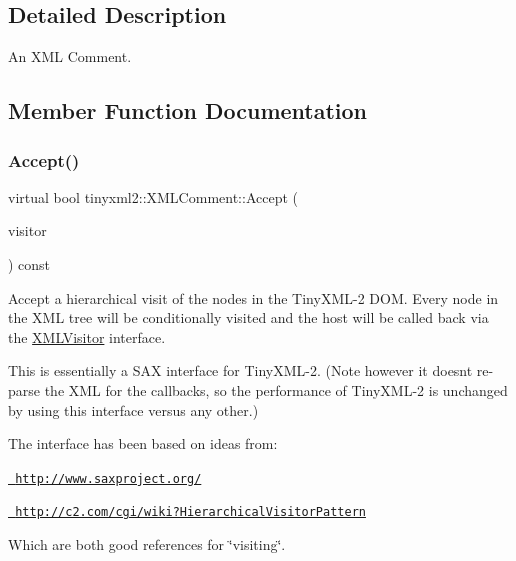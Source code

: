 \subsection{Detailed Description}
An X\+ML Comment. 

\subsection{Member Function Documentation}
\mbox{\label{classtinyxml2_1_1XMLComment_a4a33dc32fae0285b03f9cfcb3e43e122}} 
\subsubsection{\texorpdfstring{Accept()}{Accept()}}
{\footnotesize\ttfamily virtual bool tinyxml2\+::\+X\+M\+L\+Comment\+::\+Accept (\begin{DoxyParamCaption}\item[{\mbox{\hyperlink{classtinyxml2_1_1XMLVisitor}{X\+M\+L\+Visitor}} $\ast$}]{visitor }\end{DoxyParamCaption}) const\hspace{0.3cm}{\ttfamily [virtual]}}

Accept a hierarchical visit of the nodes in the Tiny\+X\+M\+L-\/2 D\+OM. Every node in the X\+ML tree will be conditionally visited and the host will be called back via the \mbox{\hyperlink{classtinyxml2_1_1XMLVisitor}{X\+M\+L\+Visitor}} interface.

This is essentially a S\+AX interface for Tiny\+X\+M\+L-\/2. (Note however it doesn\textquotesingle{}t re-\/parse the X\+ML for the callbacks, so the performance of Tiny\+X\+M\+L-\/2 is unchanged by using this interface versus any other.)

The interface has been based on ideas from\+:


\begin{DoxyItemize}
\item \href{http://www.saxproject.org/}{\texttt{ http\+://www.\+saxproject.\+org/}}
\item \href{http://c2.com/cgi/wiki?HierarchicalVisitorPattern}{\texttt{ http\+://c2.\+com/cgi/wiki?\+Hierarchical\+Visitor\+Pattern}}
\end{DoxyItemize}

Which are both good references for \char`\"{}visiting\char`\"{}.

